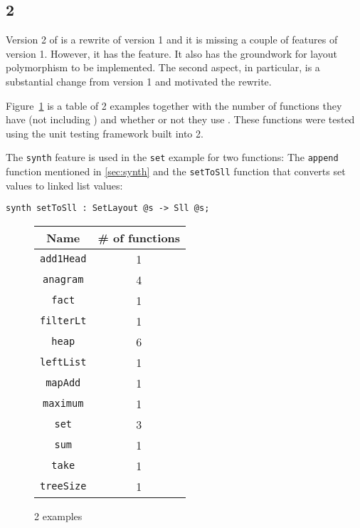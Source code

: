 \subsection{\Pika{} 2}

Version 2 of \Pika{} is a rewrite of version 1 and it is missing a couple of features of version 1. However, it has the \synth{} feature. It also has the groundwork for layout polymorphism to be implemented. The second aspect, in particular, is a substantial change from version 1 and motivated the rewrite.

Figure~\ref{fig:pika-2-examples} is a table of \Pika{} 2 examples together with the number of functions they have (not including \synth) and whether or not they use \synth. These functions were tested using the unit testing framework built into \Pika{} 2.

The \lstinline[language=Pika]{synth} feature is used in the \verb|set| example for two functions: The \verb|append| function mentioned in \autoref{sec:synth} and the
\verb|setToSll| function that converts set values to linked list values:

\begin{lstlisting}[language=Pika]
synth setToSll : SetLayout @s -> Sll @s;
\end{lstlisting}

\begin{figure}
  \begin{tabular}{|c|c|}
    \hline
    Name & \# of functions\\
    \hline
    \verb|add1Head| & 1\\
    \verb|anagram| & 4\\
    \verb|fact| & 1\\
    \verb|filterLt| & 1\\
    \verb|heap| & 6\\
    \verb|leftList| & 1\\
    \verb|mapAdd| & 1\\
    \verb|maximum| & 1\\
    \verb|set| & 3\\
    \verb|sum| & 1\\
    \verb|take| & 1\\
    \verb|treeSize| & 1\\
    \hline
  \end{tabular}
  \caption{\Pika{} 2 examples}
  \label{fig:pika-2-examples}
\end{figure}                   

